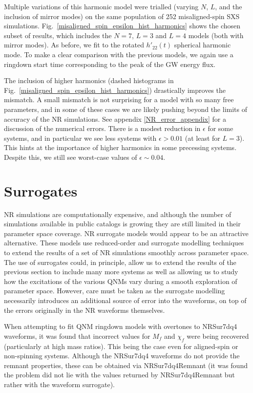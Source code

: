 Multiple variations of this harmonic model were trialled (varying $N$, $L$, and the inclusion of mirror modes) on the same population of 252 misaligned-spin SXS simulations.
Fig.~\ref{misaligned_spin_epsilon_hist_harmonics} shows the chosen subset of results, which includes the $N=7$, $L=3$ and $L=4$ models (both with mirror modes). As before, we fit to the rotated $h'_{22}(t)$ spherical harmonic mode.
To make a clear comparison with the previous models, we again use a ringdown start time corresponding to the peak of the GW energy flux.

The inclusion of higher harmonics (dashed histograms in Fig.~\ref{misaligned_spin_epsilon_hist_harmonics}) drastically improves the mismatch.
A small mismatch is not surprising for a model with so many free parameters, and in some of these cases we are likely pushing beyond the limits of accuracy of the NR simulations. See appendix \ref{NR_error_appendix} for a discussion of the numerical errors.
There is a modest reduction in $\epsilon$ for some systems, and in particular we see less systems with $\epsilon > 0.01$ (at least for $L=3$). This hints at the importance of higher harmonics in some precessing systems. Despite this, we still see worst-case values of $\epsilon \sim 0.04$.


\section{Surrogates}\label{surrogate-section}

NR simulations are computationally expensive, and although the number of simulations available in public catalogs is growing they are still limited in their parameter space coverage. 
NR surrogate models \cite{2015PhRvL.115l1102B, 2015PhRvL.115l1102B, 2017PhRvD..96b4058B, 2019PhRvR...1c3015V, 2019PhRvD..99f4045V} would appear to be an attractive alternative.
These models use reduced-order and surrogate modelling techniques to extend the results of a set of NR simulations smoothly across parameter space. 
The use of surrogates could, in principle, allow us to extend the results of the previous section to include many more systems as well as allowing us to study how the excitations of the various QNMs vary during a smooth exploration of parameter space.
However, care must be taken as the surrogate modelling necessarily introduces an additional source of error into the waveforms, on top of the errors originally in the NR waveforms themselves.
 
When attempting to fit QNM ringdown models with overtones to NRSur7dq4 \cite{2019PhRvR...1c3015V} waveforms, it was found that incorrect values for $M_f$ and $\chi_f$ were being recovered (particularly at high mass ratios). This being the case even for aligned-spin or non-spinning systems. Although the NRSur7dq4 waveforms do not provide the remnant properties, these can be obtained via NRSur7dq4Remnant \cite{2019PhRvR...1c3015V} (it was found the problem did not lie with the values returned by NRSur7dq4Remnant but rather with the waveform surrogate).

